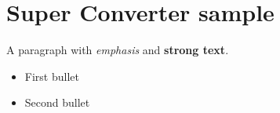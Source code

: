 \documentclass{article}
\begin{document}
\section{Super Converter sample}
A paragraph with \emph{emphasis} and \textbf{strong text}.
\begin{itemize}
\item First bullet
\item Second bullet
\end{itemize}
\end{document}
